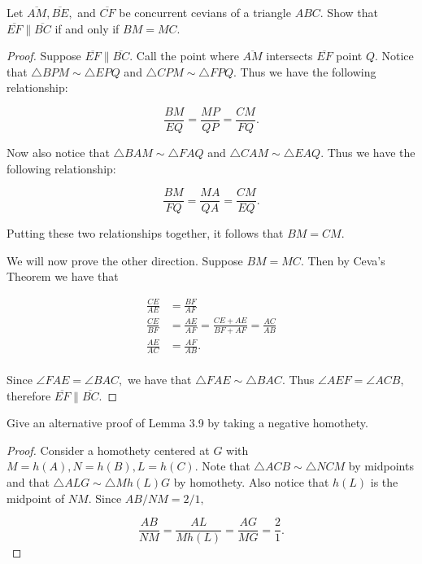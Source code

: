 \documentclass[letterpaper,oneside]{scrartcl}
\begin{document}
\begin{problem*}
  [3.6]
  Let $\overline{AM}, \overline{BE},$ and $\overline{CF}$ be concurrent cevians of a triangle $ABC.$ Show that $\overline{EF} \parallel \overline{BC}$ if and only if $BM = MC.$
\end{problem*}

\begin{proof}
  Suppose $\overline{EF} \parallel \overline{BC}.$ Call the point where $\overline{AM}$ intersects $\overline{EF}$ point $Q.$ Notice that $\triangle BPM \sim \triangle EPQ$ and $\triangle CPM \sim \triangle FPQ.$ Thus we have the following relationship:

$$\frac{BM}{EQ} = \frac{MP}{QP} = \frac{CM}{FQ}.$$

Now also notice that $\triangle BAM \sim \triangle FAQ$ and $\triangle CAM \sim \triangle EAQ.$ Thus we have the following relationship:

$$\frac{BM}{FQ} = \frac{MA}{QA} = \frac{CM}{EQ}.$$

Putting these two relationships together, it follows that $BM=CM.$  

We will now prove the other direction. Suppose $BM=MC.$ Then by Ceva's Theorem we have that

\begin{align*} 
\frac{CE}{AE}&=\frac{BF}{AF}\\
\frac{CE}{BF}&=\frac{AE}{AF} = \frac{CE+AE}{BF+AF}=\frac{AC}{AB}\\
\frac{AE}{AC}&=\frac{AF}{AB}.\\
\end{align*}

Since $\angle FAE=\angle BAC,$ we have that $\triangle FAE \sim \triangle BAC.$ Thus $\angle AEF = \angle ACB,$ therefore $\overline{EF} \parallel \overline{BC}.$
\end{proof}

\begin{problem*}
  [3.12]
  Give an alternative proof of Lemma 3.9 by taking a negative homothety.
\end{problem*}
\begin{proof}
  Consider a homothety centered at $G$ with $M=h(A), N=h(B), L = h(C).$ Note that $\triangle ACB \sim \triangle NCM$ by midpoints and that $\triangle {ALG} \sim \triangle {Mh(L)G}$ by homothety. Also notice that $h(L)$ is the midpoint of $NM.$ Since ${AB}/{NM} = 2/1,$

$$\frac{AB}{NM} = \frac{AL}{Mh(L)} = \frac{AG}{MG} = \frac21.$$
\end{proof}
\end{document}
